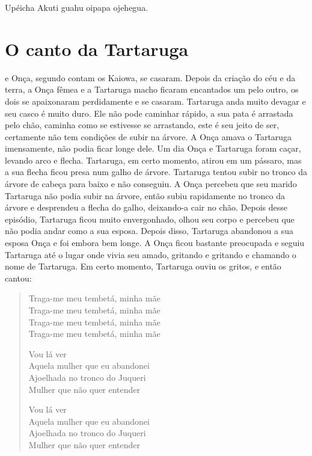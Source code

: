 Upéicha Akuti guahu oipapa ojehegua.

\chapter{O canto da Tartaruga}

 e Onça, segundo contam os Kaiowa, se casaram. Depois da
criação do céu e da terra, a Onça fêmea e a Tartaruga macho ficaram
encantados um pelo outro, os dois se apaixonaram perdidamente e se
casaram. Tartaruga anda muito devagar e seu casco é muito duro. Ele não
pode caminhar rápido, a sua pata é arrastada pelo chão, caminha como se
estivesse se arrastando, este é seu jeito de ser, certamente não tem
condições de subir na árvore. A Onça amava o Tartaruga imensamente, não
podia ficar longe dele. Um dia Onça e Tartaruga foram caçar, levando
arco e flecha. Tartaruga, em certo momento, atirou em um pássaro, mas a
sua flecha ficou presa num galho de árvore. Tartaruga tentou subir no
tronco da árvore de cabeça para baixo e não conseguiu. A Onça percebeu
que seu marido Tartaruga não podia subir na árvore, então subiu
rapidamente no tronco da árvore e desprendeu a flecha do galho,
deixando-a cair no chão. Depois desse episódio, Tartaruga ficou muito
envergonhado, olhou seu corpo e percebeu que não podia andar como a sua
esposa. Depois disso, Tartaruga abandonou a sua esposa Onça e foi embora
bem longe. A Onça ficou bastante preocupada e seguiu Tartaruga até o
lugar onde vivia seu amado, gritando e gritando e chamando o nome de
Tartaruga. Em certo momento, Tartaruga ouviu os gritos, e então cantou:

\begin{verse}
Traga-me meu tembetá, minha mãe\\
Traga-me meu tembetá, minha mãe\\
Traga-me meu tembetá, minha mãe\\
Traga-me meu tembetá, minha mãe

Vou lá ver\\
Aquela mulher que eu abandonei\\
Ajoelhada no tronco do Juqueri\footnotemark{}\\
Mulher que não quer entender

Vou lá ver\\
Aquela mulher que eu abandonei\\
Ajoelhada no tronco do Juqueri\\
Mulher que não quer entender
\end{verse}


